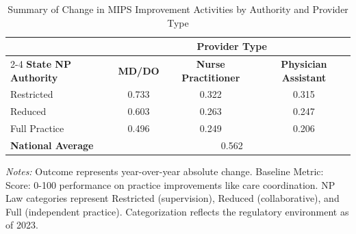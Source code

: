 \begin{table}[htbp]
    \centering
    \caption{Summary of Change in MIPS Improvement Activities by Authority and Provider Type}
    \label{tab:d_mips_ia_score_provtype}
    \vspace{0.2cm}
    \begin{tabular}{lccc}
        \toprule
        & \multicolumn{3}{c}{\textbf{Provider Type}} \\
        \cmidrule(lr){2-4}
        \textbf{State NP Authority} & \textbf{MD/DO} & \textbf{Nurse Practitioner} & \textbf{Physician Assistant} \\
        \midrule
        Restricted & 0.733 & 0.322 & 0.315 \\
        Reduced & 0.603 & 0.263 & 0.247 \\
        Full Practice & 0.496 & 0.249 & 0.206 \\
        \midrule
        \textbf{National Average} & \multicolumn{3}{c}{0.562} \\
        \bottomrule
    \end{tabular}
    \vspace{0.1cm}
    \begin{minipage}{0.85\textwidth}
        \footnotesize \textit{Notes:} Outcome represents year-over-year absolute change. Baseline Metric: Score: 0-100 performance on practice improvements like care coordination. NP Law categories represent Restricted (supervision), Reduced (collaborative), and Full (independent practice). Categorization reflects the regulatory environment as of 2023.
    \end{minipage}
\end{table}